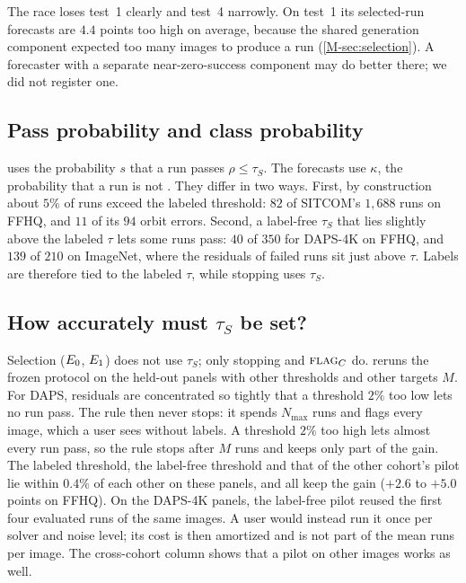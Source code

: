 The race loses test~1 clearly and test~4 narrowly.
On test~1 its selected-run forecasts are $4.4$ points too high on average, because the shared generation component expected too many images to produce a \good run (\cref{M-sec:selection}).
A forecaster with a separate near-zero-success component may do better there; we did not register one.

\subsection{Pass probability and class probability}
\label{sec:suppl-kappa}
 uses the probability $s$ that a run passes $\rho\le\tau_S$.
The forecasts use $\kappa$, the probability that a run is not \incons.
They differ in two ways.
First, by construction about $5\%$ of \good runs exceed the labeled threshold: $82$ of SITCOM's $1{,}688$ \good runs on FFHQ, and $11$ of its $94$ orbit errors.
Second, a label-free $\tau_S$ that lies slightly above the labeled $\tau$ lets some \incons runs pass: $40$ of $350$ for DAPS-4K on FFHQ, and $139$ of $210$ on ImageNet, where the residuals of failed runs sit just above $\tau$.
Labels are therefore tied to the labeled $\tau$, while stopping uses $\tau_S$.

\subsection{How accurately must $\tau_S$ be set?}
\label{sec:suppl-tauacc}
Selection ($E_0$, $E_1$) does not use $\tau_S$; only stopping and $\textsc{flag}_C$ do.
 reruns the frozen protocol on the held-out panels with other thresholds and other targets $M$.
For DAPS, residuals are concentrated so tightly that a threshold $2\%$ too low lets no run pass.
The rule then never stops: it spends $N_{\max}$ runs and flags every image, which a user sees without labels.
A threshold $2\%$ too high lets almost every run pass, so the rule stops after $M$ runs and keeps only part of the gain.
The labeled threshold, the label-free threshold and that of the other cohort's pilot lie within $0.4\%$ of each other on these panels, and all keep the gain ($+2.6$ to $+5.0$ points on FFHQ).
On the DAPS-4K panels, the label-free pilot reused the first four evaluated runs of the same images.
A user would instead run it once per solver and noise level; its cost is then amortized and is not part of the mean runs per image.
The cross-cohort column shows that a pilot on other images works as well.

